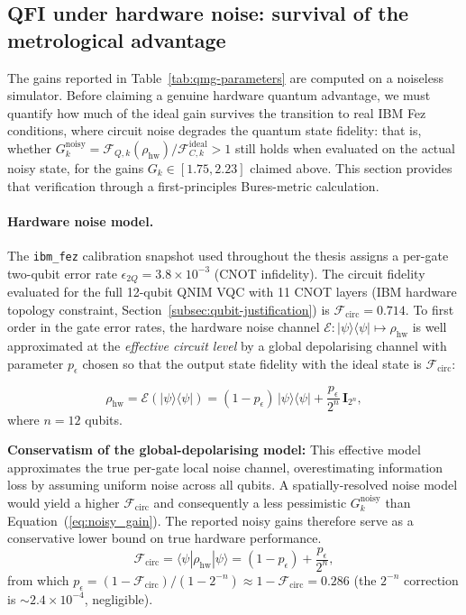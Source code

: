 \documentclass[11pt,a4paper, english]{book}
\theoremstyle{plain}
\theoremstyle{definition}
\numberwithin{equation}{chapter}
\numberwithin{figure}{chapter}
\numberwithin{table}{chapter}
\begin{document}
\subsection{QFI under hardware noise: survival of the metrological advantage}
\label{subsec:qfi-noisy}

The gains reported in Table~\ref{tab:qmg-parameters} are computed on a noiseless
simulator. Before claiming a genuine hardware quantum advantage, we must quantify how
much of the ideal gain survives the transition to real IBM Fez conditions, where
circuit noise degrades the quantum state fidelity: that is, whether
$G_k^\mathrm{noisy} = \mathcal{F}_{Q,k}(\rho_\mathrm{hw}) /
\mathcal{F}_{C,k}^\mathrm{ideal} > 1$
still holds when evaluated on the actual noisy state, for the gains
$G_k \in [1.75, 2.23]$ claimed above. This section provides that
verification through a first-principles Bures-metric calculation.

\paragraph{Hardware noise model.}
The \texttt{ibm\_fez} calibration snapshot used throughout the thesis
assigns a per-gate two-qubit error rate $\epsilon_{2Q} = 3.8\times10^{-3}$
(CNOT infidelity).  The circuit fidelity evaluated for the full 12-qubit
QNIM VQC with 11 CNOT layers (IBM hardware topology 
constraint, Section~\ref{subsec:qubit-justification})
is $\mathcal{F}_\mathrm{circ} = 0.714$.  To first order in the gate
error rates, the hardware noise channel
$\mathcal{E}: |\psi\rangle\langle\psi| \mapsto \rho_\mathrm{hw}$
is well approximated at the \emph{effective circuit level} by a global
depolarising channel with parameter $p_\epsilon$ chosen so that the
output state fidelity with the ideal state is $\mathcal{F}_\mathrm{circ}$:

\begin{equation}
  \label{eq:global_depolarising}
  \rho_\mathrm{hw} = \mathcal{E}(|\psi\rangle\langle\psi|)
    = (1-p_\epsilon)\,|\psi\rangle\langle\psi|
      + \frac{p_\epsilon}{2^n}\,\mathbf{I}_{2^n},
\end{equation}
where $n = 12$ qubits.  

\noindent\textbf{Conservatism of the global-depolarising model:} This effective model approximates the true per-gate local noise channel, overestimating information loss by assuming uniform noise across all qubits.  A spatially-resolved noise model would yield a higher $\mathcal{F}_\mathrm{circ}$ and consequently a less pessimistic $G_k^\mathrm{noisy}$ than Equation~(\ref{eq:noisy_gain}).  The reported noisy gains therefore serve as a conservative lower bound on true hardware performance.
\begin{equation}
  \label{eq:fidelity_depol}
  \mathcal{F}_\mathrm{circ} = \langle\psi|\rho_\mathrm{hw}|\psi\rangle
    = (1-p_\epsilon) + \frac{p_\epsilon}{2^n},
\end{equation}
from which $p_\epsilon = (1 - \mathcal{F}_\mathrm{circ})
/ (1 - 2^{-n}) \approx 1 - \mathcal{F}_\mathrm{circ} = 0.286$
(the $2^{-n}$ correction is $\sim\!2.4\times10^{-4}$, negligible).
\end{document}
